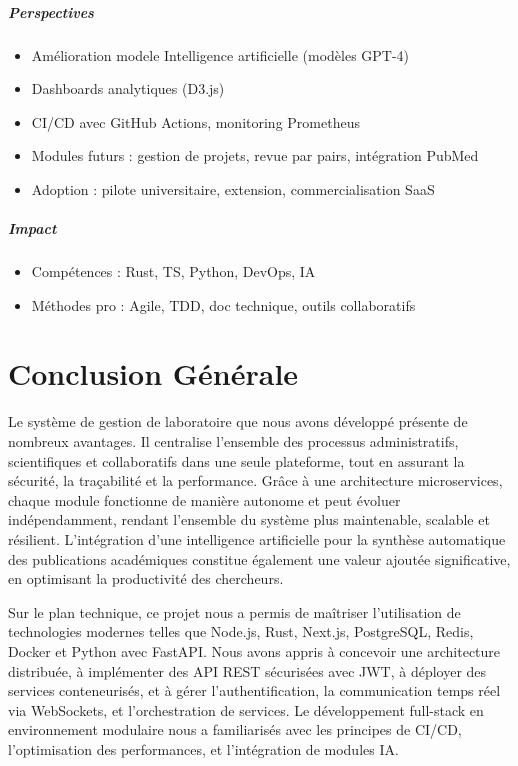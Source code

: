 \documentclass[12pt]{rapportPfe}
\begin{document}
\paragraph{Perspectives}
\begin{itemize}
    \item Amélioration modele Intelligence artificielle (modèles GPT-4)
    \item Dashboards analytiques (D3.js)
    \item CI/CD avec GitHub Actions, monitoring Prometheus
    \item Modules futurs : gestion de projets, revue par pairs, intégration PubMed
    \item Adoption : pilote universitaire, extension, commercialisation SaaS
\end{itemize}

\paragraph{Impact}
\begin{itemize}
    \item Compétences : Rust, TS, Python, DevOps, IA
    \item Méthodes pro : Agile, TDD, doc technique, outils collaboratifs
\end{itemize}


\newpage
\chapter*{Conclusion Générale}
Le système de gestion de laboratoire que nous avons développé présente de nombreux avantages. Il centralise l’ensemble des processus administratifs, scientifiques et collaboratifs dans une seule plateforme, tout en assurant la sécurité, la traçabilité et la performance. Grâce à une architecture microservices, chaque module fonctionne de manière autonome et peut évoluer indépendamment, rendant l’ensemble du système plus maintenable, scalable et résilient. L’intégration d’une intelligence artificielle pour la synthèse automatique des publications académiques constitue également une valeur ajoutée significative, en optimisant la productivité des chercheurs.

Sur le plan technique, ce projet nous a permis de maîtriser l’utilisation de technologies modernes telles que Node.js, Rust, Next.js, PostgreSQL, Redis, Docker et Python avec FastAPI. Nous avons appris à concevoir une architecture distribuée, à implémenter des API REST sécurisées avec JWT, à déployer des services conteneurisés, et à gérer l’authentification, la communication temps réel via WebSockets, et l’orchestration de services. Le développement full-stack en environnement modulaire nous a familiarisés avec les principes de CI/CD, l’optimisation des performances, et l’intégration de modules IA.
\end{document}
